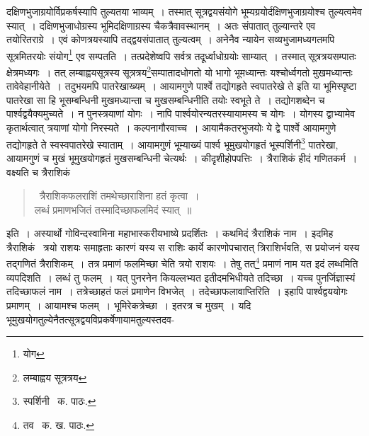 \documentclass[11pt, openany]{book}
\begin{document}
\newpage

\noindent दक्षिणभुजाग्रयोर्विप्रकर्षस्यापि तुल्यतया भाव्यम्~। तस्मात् सूत्रद्वयसंयोगे भूम्यग्रयोर्दक्षिणभुजाग्रयोश्च तुल्यत्वमेव स्यात्~। दक्षिणभुजाधोग्रस्य भूमिदक्षिणाग्रस्य चैकत्रैवावस्थानम्~। अतः संपातात् तुल्यान्तरे एव तयोरितराग्रे~। एवं कोणत्रयस्यापि तद्द्वयसंपातात् तुल्यत्वम्~। अनेनैव न्यायेन सव्यभुजामध्यगतमपि सूत्रमितरयोः संयोग\renewcommand{\thefootnote}{१}\footnote{योग} एव सम्पतति~। तत्प्रदेशेष्वपि सर्वत्र तदूर्ध्वाधोग्रयोः साम्यात्~। तस्मात् सूत्रत्रयसम्पातः क्षेत्रमध्यगः~। तत् लम्बाह्वयसूत्रस्य सूत्रत्रय\renewcommand{\thefootnote}{२}\footnote{लम्बाह्वय सूत्रत्रय}सम्पातादधोगतो यो भागो भूमध्यान्तः यश्चोर्ध्वगतो मुखमध्यान्तः तावेवेहानीयेते~। तदुभयमपि पातरेखाख्यम्~। {\qt आयामगुणे पार्श्वे तद्योगहृते स्वपातरेखे ते} इति या भूमिस्पृष्टा पातरेखा सा हि भूसम्बन्धिनी मुखमध्यान्ता च मुखसम्बन्धिनीति तयोः स्वभूते ते~। तद्योगशब्देन च पार्श्वद्वयैक्यमुच्यते~। न पुनस्त्रयाणां योगः~। नापि
पार्श्वयोरन्यतरस्यायामस्य च योगः~। योगस्य द्वाभ्यामेव कृतार्थत्वात् त्रयाणां योगो निरस्यते~। कल्पनागौरवाच्च~। आयामैकतरभुजयोः ये द्वे पार्श्वे आयामगुणे तद्योगहृते ते स्वस्वपातरेखे स्याताम्~। आयामगुणं भूम्याख्यं पार्श्व भूमुखयोगहृतं भूस्पर्शिनी\renewcommand{\thefootnote}{३}\footnote{स्पर्शिनी \textendash\ क. पाठः.} पातरेखा, आयामगुणं च मुखं भूमुखयोगहृतं मुखसम्बन्धिनी चेत्यर्थः~। कीदृशीहोपपत्तिः~। त्रैराशिकं हीदं गणितकर्म~। वक्ष्यति च त्रैराशिकं\textendash 

\begin{quote}\
{\qt त्रैराशिकफलराशिं तमथेच्छाराशिना हतं कृत्वा~।\\
लब्धं प्रमाणभजितं तस्मादिच्छाफलमिदं स्यात्~॥}
\end{quote}
\noindent इति~। अस्यार्थो गोविन्दस्वामिना महाभास्करीयभाष्ये प्रदर्शितः~। कथमिदं त्रैराशिकं नाम~। इदमिह त्रैराशिकं \textendash\ त्रयो राशयः समाहृताः कारणं यस्य स राशिः कार्ये कारणोपचारात् त्रिराशिर्भवति, स प्रयोजनं यस्य तद्गणितं त्रैराशिकम्~। तत्र प्रमाणं फलमिच्छा चेति त्रयो राशयः~। तेषु तत्\renewcommand{\thefootnote}{४}\footnote{तव \textendash\ क. ख. पाठः.} प्रमाणं नाम यत इदं लब्धमिति व्यपदिशति~। लब्धं तु फलम्~। यत् पुनरनेन कियल्लभ्यत इतीदमभिधीयते तदिच्छा~। यच्च पुनर्जिज्ञास्यं तदिच्छाफलं नाम~। तत्रेच्छाहतं फलं प्रमाणेन विभजेत्~। तदेच्छाफलावाप्तिरिति~। इहापि पार्श्वद्वययोगः प्रमाणम्~। आयामश्च फलम्~। भूमिरेकत्रेच्छा~। इतरत्र च मुखम्~। यदि भूमुखयोगतुल्येनैतत्सूत्रद्वयविप्रकर्षेणायामतुल्यस्तदव-

\newpage
\end{document}
